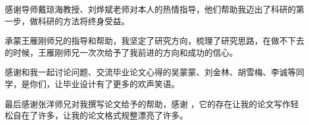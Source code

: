 
\begin{ack}
  感谢导师戴琼海教授、刘烨斌老师对本人的热情指导，他们帮助我迈出了科研的第一步，做科研的方法将终身受益。

  承蒙王雁刚师兄的指导和帮助，我坚定了研究方向，梳理了研究思路，在做不下去的时候，王雁刚师兄一次次给予了我前进的方向和成功的信心。

  感谢和我一起讨论问题、交流毕业论文心得的吴蒙蒙、刘金林、胡雪梅、李诚等同学，是你们，让毕业设计有了更多的欢声笑语。

  最后感谢张洋师兄对我撰写论文给予的帮助，感谢 \thuthesis ，它的存在让我的论文写作轻松自在了许多，让我的论文格式规整漂亮了许多。

\end{ack}
